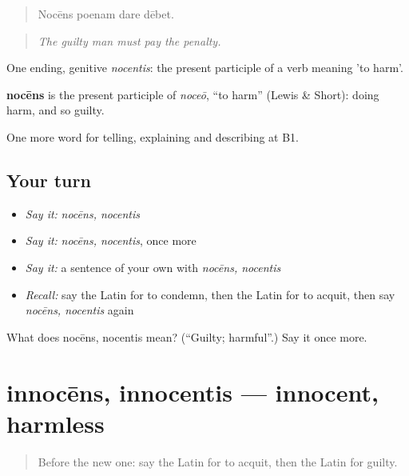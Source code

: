 \begin{quote}
Nocēns poenam dare dēbet.
\end{quote}

\begin{quote}
\emph{The guilty man must pay the penalty.}
\end{quote}

One ending, genitive \emph{nocentis}: the present participle of a verb meaning 'to harm'.

\begin{cousinweb}
\textbf{nocēns} is the present participle of \emph{noceō}, \textquotedblleft{}to harm\textquotedblright{} (Lewis \& Short): doing harm, and so guilty.
\end{cousinweb}

\begin{grammarlens}[title={What you've built}]
One more word for telling, explaining and describing at B1.
\end{grammarlens}

\subsection*{Your turn}
\begin{itemize}
\raggedright
  \item \emph{Say it:} \emph{nocēns, nocentis}
  \item \emph{Say it:} \emph{nocēns, nocentis}, once more
  \item \emph{Say it:} a sentence of your own with \emph{nocēns, nocentis}
  \item \emph{Recall:} say the Latin for to condemn, then the Latin for to acquit, then say \emph{nocēns, nocentis} again
\end{itemize}

\begin{tcolorbox}[breakable,colback=teal!4,colframe=teal!35!black,title={Before you move on}]
What does nocēns, nocentis mean? (\textquotedblleft{}Guilty; harmful\textquotedblright{}.) Say it once more.
\end{tcolorbox}
\section[innocēns, innocentis]{innocēns, innocentis — innocent, harmless}

\label{lesson:LA-C311-innocens}



\begin{quote}
Before the new one: say the Latin for to acquit, then the Latin for guilty.
\end{quote}

